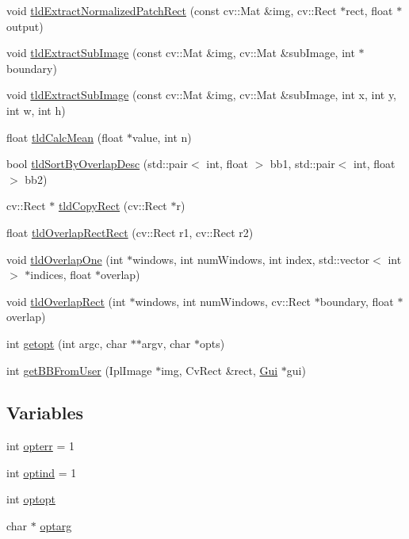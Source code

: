 \begin{DoxyCompactItemize}
\item 
void \hyperlink{namespacetld_aa6c803037b38609e1fceadbb2ad8a75c}{tldExtractNormalizedPatchRect} (const cv::Mat \&img, cv::Rect $\ast$rect, float $\ast$output)
\item 
void \hyperlink{namespacetld_a16fe2b016494fa66be611f723ed7bebc}{tldExtractSubImage} (const cv::Mat \&img, cv::Mat \&subImage, int $\ast$boundary)
\item 
void \hyperlink{namespacetld_a7699b7dc20502fc6d7c5c6c6cbd4be7b}{tldExtractSubImage} (const cv::Mat \&img, cv::Mat \&subImage, int x, int y, int w, int h)
\item 
float \hyperlink{namespacetld_ac0065f4088098aca6e1edd49b2b0f9d3}{tldCalcMean} (float $\ast$value, int n)
\item 
bool \hyperlink{namespacetld_acaf374df081816ecaf9079e200a8f5af}{tldSortByOverlapDesc} (std::pair$<$ int, float $>$ bb1, std::pair$<$ int, float $>$ bb2)
\item 
cv::Rect $\ast$ \hyperlink{namespacetld_a41fd3532bec99e023ff75b4706632182}{tldCopyRect} (cv::Rect $\ast$r)
\item 
float \hyperlink{namespacetld_afdab54607fed863cdc408f72fd0f774b}{tldOverlapRectRect} (cv::Rect r1, cv::Rect r2)
\item 
void \hyperlink{namespacetld_a018caa7bf4a554814fe61a679a219489}{tldOverlapOne} (int $\ast$windows, int numWindows, int index, std::vector$<$ int $>$ $\ast$indices, float $\ast$overlap)
\item 
void \hyperlink{namespacetld_ae87c7dbe6b4da1e1923c42bec18caaf6}{tldOverlapRect} (int $\ast$windows, int numWindows, cv::Rect $\ast$boundary, float $\ast$overlap)
\item 
int \hyperlink{namespacetld_a5b279570cd95fb0067a41b5a222e2642}{getopt} (int argc, char $\ast$$\ast$argv, char $\ast$opts)
\item 
int \hyperlink{namespacetld_a75cd208f8053ece69d5d7de9c2ed33fd}{getBBFromUser} (IplImage $\ast$img, CvRect \&rect, \hyperlink{classtld_1_1_gui}{Gui} $\ast$gui)
\end{DoxyCompactItemize}
\subsection*{Variables}
\begin{DoxyCompactItemize}
\item 
int \hyperlink{namespacetld_a6e180d5067af278cc277ae9c6f7507c1}{opterr} = 1
\item 
int \hyperlink{namespacetld_ab8c5a378ef03678c537edc84a15abc22}{optind} = 1
\item 
int \hyperlink{namespacetld_a6d6bd80732b9f396bc03e5f2c5cf30f8}{optopt}
\item 
char $\ast$ \hyperlink{namespacetld_a1bbc7d3201a2ef41da5495e0e48cfd2e}{optarg}
\end{DoxyCompactItemize}



